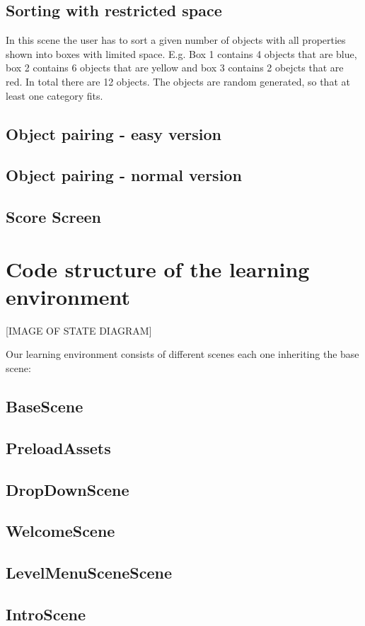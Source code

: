 \subsection{Sorting with restricted space}
In this scene the user has to sort a given number of objects with all properties shown into boxes with limited space.
E.g. Box 1 contains 4 objects that are blue, box 2 contains 6 objects that are yellow
and box 3 contains 2 obejcts that are red. In total there are 12 objects.
The objects are random generated, so that at least one category fits.

\subsection{Object pairing - easy version}
\subsection{Object pairing - normal version}
\subsection{Score Screen}

\section{Code structure of the learning environment}
[IMAGE OF STATE DIAGRAM]

Our learning environment consists of different scenes each one inheriting the base scene:
\subsection{BaseScene}
\subsection{PreloadAssets}
\subsection{DropDownScene}
\subsection{WelcomeScene}
\subsection{LevelMenuSceneScene}
\subsection{IntroScene}
